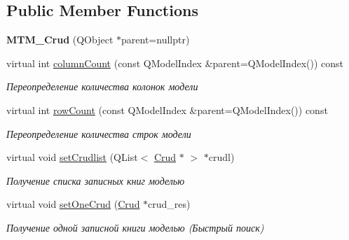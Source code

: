 \subsection*{Public Member Functions}
\begin{DoxyCompactItemize}
\item 
\mbox{\label{class_m_t_m___crud_a6646610644ca58097d3b977f4f5f88c9}} 
{\bfseries M\+T\+M\+\_\+\+Crud} (Q\+Object $\ast$parent=nullptr)
\item 
\mbox{\label{class_m_t_m___crud_a7166cab72a1768f94f5277386d9d33f9}} 
virtual int \mbox{\hyperlink{class_m_t_m___crud_a7166cab72a1768f94f5277386d9d33f9}{column\+Count}} (const Q\+Model\+Index \&parent=Q\+Model\+Index()) const
\begin{DoxyCompactList}\small\item\em Переопределение количества колонок модели \end{DoxyCompactList}\item 
\mbox{\label{class_m_t_m___crud_a6821ce8aa820d5293335a702efbf2c10}} 
virtual int \mbox{\hyperlink{class_m_t_m___crud_a6821ce8aa820d5293335a702efbf2c10}{row\+Count}} (const Q\+Model\+Index \&parent=Q\+Model\+Index()) const
\begin{DoxyCompactList}\small\item\em Переопределение количества строк модели \end{DoxyCompactList}\item 
\mbox{\label{class_m_t_m___crud_a3ba02a51a3c8ca84c47a1660250c43e3}} 
virtual void \mbox{\hyperlink{class_m_t_m___crud_a3ba02a51a3c8ca84c47a1660250c43e3}{set\+Crudlist}} (Q\+List$<$ \mbox{\hyperlink{class_crud}{Crud}} $\ast$ $>$ $\ast$crudl)
\begin{DoxyCompactList}\small\item\em Получение списка записных книг моделью \end{DoxyCompactList}\item 
\mbox{\label{class_m_t_m___crud_a118b8bf4d90de45def54e4aa96cd4b57}} 
virtual void \mbox{\hyperlink{class_m_t_m___crud_a118b8bf4d90de45def54e4aa96cd4b57}{set\+One\+Crud}} (\mbox{\hyperlink{class_crud}{Crud}} $\ast$crud\+\_\+res)
\begin{DoxyCompactList}\small\item\em Получение одной записной книги моделью (Быстрый поиск) \end{DoxyCompactList}\item 

\end{DoxyCompactItemize}

